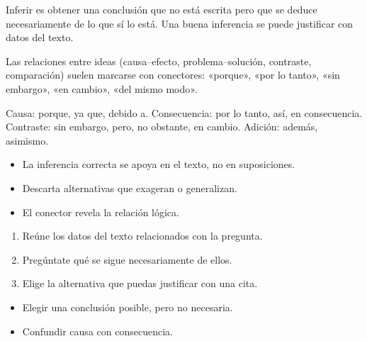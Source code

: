 \documentclass[10pt,a4paper,twocolumn]{article}
\begin{document}
Inferir es obtener una conclusión que no está escrita pero que se deduce necesariamente de lo que sí lo está. Una buena inferencia se puede justificar con datos del texto.

Las relaciones entre ideas (causa–efecto, problema–solución, contraste, comparación) suelen marcarse con conectores: «porque», «por lo tanto», «sin embargo», «en cambio», «del mismo modo».

\begin{definicion}
Causa: porque, ya que, debido a. Consecuencia: por lo tanto, así, en consecuencia. Contraste: sin embargo, pero, no obstante, en cambio. Adición: además, asimismo.
\end{definicion}

\begin{ideasclave}
\begin{itemize}
  \item La inferencia correcta se apoya en el texto, no en suposiciones.
  \item Descarta alternativas que exageran o generalizan.
  \item El conector revela la relación lógica.
\end{itemize}
\end{ideasclave}

\begin{metodo}
\begin{enumerate}
  \item Reúne los datos del texto relacionados con la pregunta.
  \item Pregúntate qué se sigue necesariamente de ellos.
  \item Elige la alternativa que puedas justificar con una cita.
\end{enumerate}
\end{metodo}

\begin{errorfrecuente}
\begin{itemize}
  \item Elegir una conclusión posible, pero no necesaria.
  \item Confundir causa con consecuencia.
\end{itemize}
\end{errorfrecuente}
\end{document}
